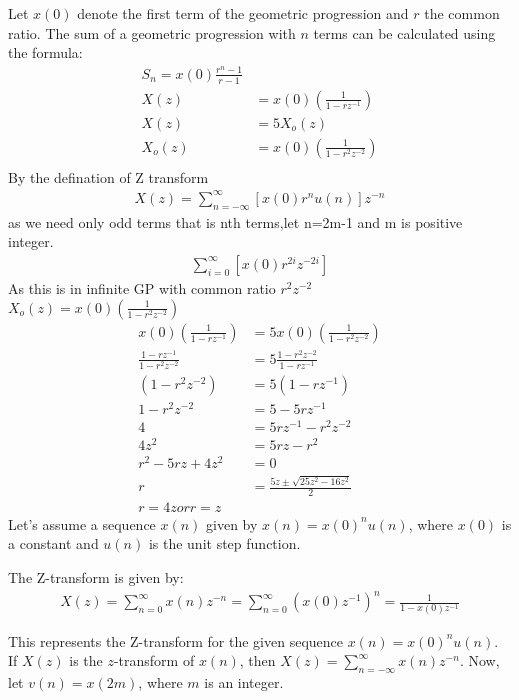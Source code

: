 \documentclass{article}
\begin{document}
Let \( x(0) \) denote the first term of the geometric progression and \( r \) the common ratio. The sum of a geometric progression with \( n \) terms can be calculated using the formula:
\begin{align}
 S_n = x(0) \frac{{r^n - 1}}{{r - 1}} \\
X(z) &= x(0)\left(\frac{1}{1 - rz^{-1}}\right) \\
X(z) &= 5 X_o(z) \\
X_o(z) &= x(0)\left(\frac{1}{1 - r^2z^{-2}}\right) \\
\end{align}
By the defination of Z transform 
\begin{align}
X(z)= \sum_{n=-\infty}^{\infty} [x(0)r^{n}u(n)]z^{-n}
\end{align}
as we need only odd terms that is nth terms,let n=2m-1 and m is positive integer.
\begin{align}
\sum_{i=0}^{\infty} [x(0)r^{2i}z^{-2i}]
\end{align}
As this is in infinite GP with common ratio $r^{2}z^{-2}$\\
$X_o(z)= x(0)\left(\frac{1}{1 - r^2z^{-2}}\right)$ \\
\begin{align}
x(0)\left(\frac{1}{1 - rz^{-1}}\right) &= 5 x(0)\left(\frac{1}{1 - r^2z^{-2}}\right) \\
\frac{1 - rz^{-1}}{1 - r^2z^{-2}} &= 5 \frac{1 - r^2z^{-2}}{1 - rz^{-1}} \\
(1 - r^2z^{-2}) &= 5 (1 - rz^{-1}) \\
1 - r^2z^{-2} &= 5 - 5rz^{-1} \\
4 &= 5rz^{-1} - r^2z^{-2} \\
4z^2 &= 5rz - r^2 \\
r^2 - 5rz + 4z^2 &= 0 \\
r &= \frac{5z \pm \sqrt{25z^2 - 16z^2}}{2}\\
r=4z or r=z
\end{align}
Let's assume a sequence \( x(n) \) given by \( x(n) =x(0)^n u(n) \), where \( x(0) \) is a constant and \( u(n) \) is the unit step function.

The Z-transform is given by:
\begin{align}
X(z) = \sum_{n=0}^{\infty} x(n)z^{-n} = \sum_{n=0}^{\infty} (x(0)z^{-1})^n = \frac{1}{1 - x(0)z^{-1}} 
\end{align}

This represents the Z-transform for the given sequence \( x(n) = x(0)^n u(n) \).\\
If \(X(z)\) is the \(z\)-transform of \(x(n)\), then \(X(z) = \sum_{n=-\infty}^{\infty} x(n)z^{-n}\). Now, let \(v(n)=x(2m)\), where \(m\) is an integer.
\end{document}
